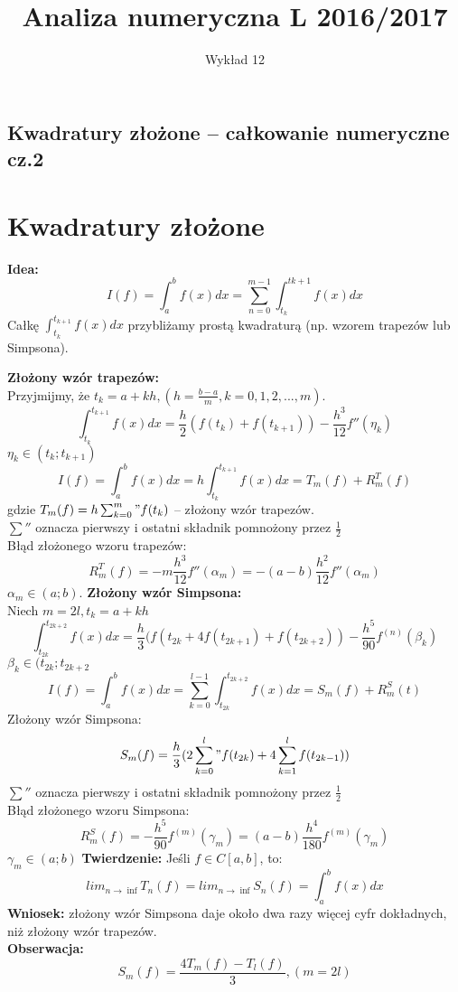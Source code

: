 \documentclass[12pt]{article}
\author{\LARGE Wykład 12}
\title{\bfseries\Huge Analiza numeryczna L 2016/2017}
\date{}
\begin{document}
\maketitle
\begin{center}
\section*{\Large Kwadratury złożone -- całkowanie numeryczne cz.2 }

\end{center}
\vspace{5mm}
\section*{Kwadratury złożone}
\textbf{Idea:}
$$I(f) = \int^b_af(x)dx = \sum^{m-1}_{n=0} \int^{t{k+1}}_{t_k} f(x)dx$$
Całkę $\int^{t_{k+1}}_{t_k} f(x)dx$ przybliżamy prostą kwadraturą (np. wzorem trapezów lub Simpsona).\\
\linebreak


\textbf{Złożony wzór trapezów:}\\
Przyjmijmy, że $t_k=a +kh, (h = \frac{b-a}{m}, k = 0,1,2,...,m)$.
$$\int^{t_{k+1}}_{t_k} f(x)dx = \frac{h}{2}(f(t_k) + f(t_{k+1})) - \frac{h^3}{12}f''(\eta_k)$$
$\eta_k \in (t_k;t_{k+1})$
$$I(f) = \int^b_af(x)dx = h\int^{t_{k+1}}_{t_k} f(x)dx = T_m(f) + R^T_m(f)$$
gdzie $T_m(f) = h \sum^m_{k=0}"f(t_k)$ -- złożony wzór trapezów.\\
\linebreak
$\sum ''$ oznacza pierwszy i ostatni składnik pomnożony przez $\frac{1}{2}$\\
\linebreak
Błąd złożonego wzoru trapezów:
$$R^T_m(f) = -m\frac{h^3}{12}f''(\alpha_m) = -(a-b)\frac{h^2}{12}f''(\alpha_m)$$
$\alpha_m \in (a;b)$.
\newpage
{}
\setcounter{page}{2}
\textbf{Złożony wzór Simpsona:}\\
Niech $m=2l, t_k=a + kh$
$$\int^{t_{2k+2}}_{t_{2k}} f(x)dx = \frac{h}{3}(f(t_{2k} + 4f(t_{2k+1}) +f(t_{2k+2}))- \frac{h^5}{90}f^{(n)}(\beta_k)$$
$\beta_k \in (t_{2k};t_{2k+2}$
$$I(f) = \int^b_af(x)dx = \sum^{l-1}_{k=0} \int^{t_{2k+2}}_{t_{2k}} f(x)dx = S_m(f) + R^S_m(t)$$
Złożony wzór Simpsona:
$$ S_m(f) =  \frac{h}{3}(2 \sum^l_{k=0}"f(t_{2k}) + 4\sum^l_{k=1} f(t_{2k-1}))$$
$\sum ''$ oznacza pierwszy i ostatni składnik pomnożony przez $\frac{1}{2}$\\
\linebreak
Błąd złożonego wzoru Simpsona:
$$R_m^S(f) = -\frac{h^5}{90}f^{(m)}(\gamma_m) = (a-b)\frac{h^4}{180}f^{(m)}(\gamma_m)$$
$\gamma_m \in (a;b)$
\textbf{Twierdzenie:} Jeśli $f \in C[a,b]$, to:
$$ lim_{n \rightarrow \inf} T_n(f) = lim_{n \rightarrow \inf} S_n(f) = \int^b_a f(x)dx $$
\textbf{Wniosek:} złożony wzór Simpsona daje około dwa razy więcej cyfr dokładnych, niż złożony wzór trapezów.\\
\textbf{Obserwacja:}
$$S_m(f) = \frac{4T_m(f) - T_l(f)}{3}, (m=2l)$$
\newpage
\end{document}
